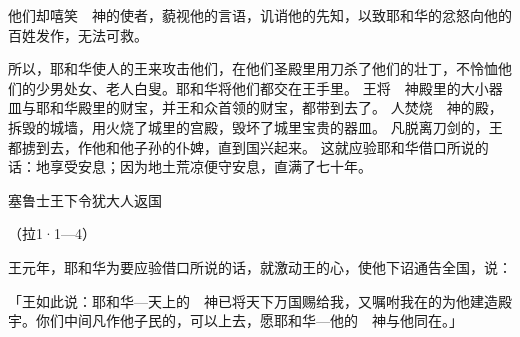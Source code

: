 {他们却嘻笑　神的使者，藐视他的言语，讥诮他的先知，以致耶和华的忿怒向他的百姓发作，无法可救。
\par }{\PP {}所以，耶和华使{}人的王来攻击他们，在他们圣殿里用刀杀了他们的壮丁，不怜恤他们的少男处女、老人白叟。耶和华将他们都交在{}王手里。
王将　神殿里的大小器皿与耶和华殿里的财宝，并王和众首领的财宝，都带到{}去了。
人焚烧　神的殿，拆毁{}的城墙，用火烧了城里的宫殿，毁坏了城里宝贵的器皿。
凡脱离刀剑的，{}王都掳到{}去，作他和他子孙的仆婢，直到{}国兴起来。
这就应验耶和华借{}口所说的话：地享受安息；因为地土荒凉便守安息，直满了七十年。
\par }{\SH 塞鲁士王下令犹大人返国
\par }{\R （拉1·1—4）
\par }{\PP {}王{}元年，耶和华为要应验借{}口所说的话，就激动{}王{}的心，使他下诏通告全国，说：
\par }{\PP {}「{}王{}如此说：耶和华—天上的　神已将天下万国赐给我，又嘱咐我在{}的{}为他建造殿宇。你们中间凡作他子民的，可以上去，愿耶和华—他的　神与他同在。」
\par }